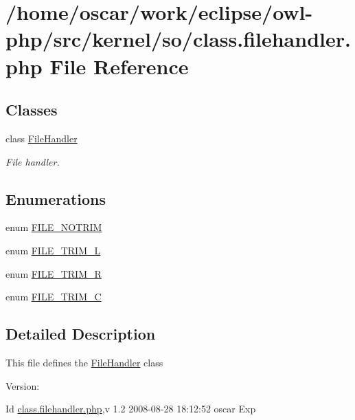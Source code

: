 \hypertarget{class_8filehandler_8php}{
\section{/home/oscar/work/eclipse/owl-php/src/kernel/so/class.filehandler.php File Reference}
\label{class_8filehandler_8php}
}
\subsection*{Classes}
\begin{CompactItemize}
\item 
class \hyperlink{classFileHandler}{FileHandler}
\begin{CompactList}\small\item\em File handler. \item\end{CompactList}\end{CompactItemize}
\subsection*{Enumerations}
\begin{CompactItemize}
\item 
enum \hyperlink{class_8filehandler_8php_3720f2e15eb9e16e29d8ecbb96763662}{FILE\_\-NOTRIM} 
\item 
enum \hyperlink{class_8filehandler_8php_080de95fd7cf2e8d8ac78ac7ad9471ee}{FILE\_\-TRIM\_\-L} 
\item 
enum \hyperlink{class_8filehandler_8php_7ee25ec88036b90f5a0ae8be7bc41769}{FILE\_\-TRIM\_\-R} 
\item 
enum \hyperlink{class_8filehandler_8php_2787c3a1ecef8697c863800d0b2848a4}{FILE\_\-TRIM\_\-C} 
\end{CompactItemize}


\subsection{Detailed Description}
This file defines the \hyperlink{classFileHandler}{FileHandler} class \begin{Desc}
\item[Version:]\end{Desc}
\begin{Desc}
\item[Id]\hyperlink{class_8filehandler_8php}{class.filehandler.php},v 1.2 2008-08-28 18:12:52 oscar Exp \end{Desc}


